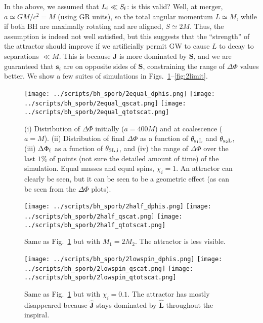 \documentclass[11pt,
        usenames, %
        dvipsnames %
    ]{article}
\newcommand*{\bm}[1]{\boldsymbol{\mathbf{#1}}}
\newcommand*{\uv}[1]{\hat{\bm{#1}}}
\begin{document}
In the above, we assumed that $L_{\rm f} \ll S_{\rm f}$: is this valid? Well, at
merger, $a \simeq GM/c^2 = M$ (using GR units), so the total angular momentum $L
\simeq M$, while if both BH are maximally rotating and are aligned, $S \simeq
2M$. Thus, the assumption is indeed not well satisfied, but this suggests that
the ``strength'' of the attractor should improve if we artificially permit GW to
cause $L$ to decay to separations $\ll M$. This is because $\bm{J}$ is more
dominated by $\bm{S}$, and we are guaranteed that $\bm{s}_i$ are on opposite
sides of $\bm{S}$, constraining the range of $\Delta \Phi$ values better. We
show a few suites of simulations in Figs.~\ref{fig:2equal}--\ref{fig:2limit}.
\begin{figure}
    \centering
    \texttt{[image: ../scripts/bh\_sporb/2equal\_dphis.png]}
    \texttt{[image: ../scripts/bh\_sporb/2equal\_qscat.png]}
    \texttt{[image: ../scripts/bh\_sporb/2equal\_qtotscat.png]}
    \caption{(i) Distribution of $\Delta \Phi$ initially ($a = 400 M$) and at
    coalescence ($a = M$). (ii) Distribution of final $\Delta \Phi$ as a
    function of $\theta_{\rm s_1L}$ and $\theta_{\rm s_2L}$, (iii) $\Delta
    \Phi_{\rm f}$ as a function of $\theta_{\rm SL, i}$, and (iv) the range of
    $\Delta \Phi$ over the last $1\%$ of points (not sure the detailed amount of
    time) of the simulation. Equal masses and equal spins, $\chi_i = 1$. An
    attractor can clearly be seen, but it can be seen to be a geometric
    effect (as can be seen from the $\Delta \Phi$ plots).}\label{fig:2equal}
\end{figure}
\begin{figure}
    \centering
    \texttt{[image: ../scripts/bh\_sporb/2half\_dphis.png]}
    \texttt{[image: ../scripts/bh\_sporb/2half\_qscat.png]}
    \texttt{[image: ../scripts/bh\_sporb/2half\_qtotscat.png]}
    \caption{Same as Fig.~\ref{fig:2equal} but with $M_1 = 2M_2$. The attractor
    is less visible.}\label{fig:2half}
\end{figure}
\begin{figure}
    \centering
    \texttt{[image: ../scripts/bh\_sporb/2lowspin\_dphis.png]}
    \texttt{[image: ../scripts/bh\_sporb/2lowspin\_qscat.png]}
    \texttt{[image: ../scripts/bh\_sporb/2lowspin\_qtotscat.png]}
    \caption{Same as Fig.~\ref{fig:2equal} but with $\chi_i =
    0.1$. The attractor has mostly disappeared because $\uv{J}$ stays dominated
    by $\uv{L}$ throughout the inspiral.}\label{fig:2lowspin}
\end{figure}
\end{document}
